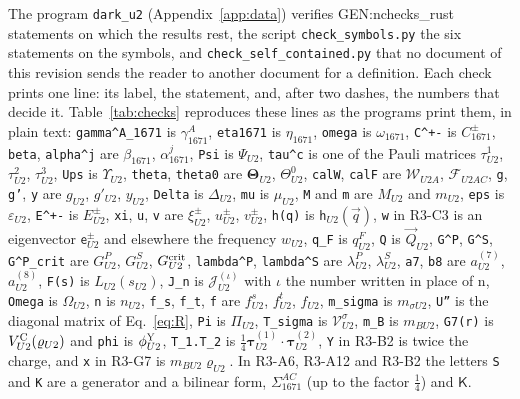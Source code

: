 The program \texttt{dark\_u2} (Appendix~\ref{app:data}) verifies {{GEN:nchecks_rust}} statements on
which the results rest, the script \texttt{check\_symbols.py} the six statements on the symbols, and
\texttt{check\_self\_contained.py} that no document of this revision sends the reader to another
document for a definition. Each check prints one line: its label, the statement, and, after two
dashes, the numbers that decide it. Table~\ref{tab:checks} reproduces these lines as the programs
print them, in plain text: \texttt{gamma\^{}A\_1671} is $\gamma^A_{1671}$, \texttt{eta1671} is
$\eta_{1671}$, \texttt{omega} is $\omega_{1671}$, \texttt{C\^{}+-} is $C^\pm_{1671}$, \texttt{beta},
\texttt{alpha\^{}j} are $\beta_{1671}$, $\alpha^j_{1671}$, \texttt{Psi} is $\Psi_{U2}$, \texttt{tau\^{}c}
is one of the Pauli matrices $\tau^1_{U2}$, $\tau^2_{U2}$, $\tau^3_{U2}$, \texttt{Ups} is
$\Upsilon_{U2}$, \texttt{theta}, \texttt{theta0} are $\boldsymbol\Theta_{U2}$, $\Theta^0_{U2}$,
\texttt{calW}, \texttt{calF} are $\mathcal W_{U2A}$, $\mathcal F_{U2AC}$, \texttt{g}, \texttt{g'},
\texttt{y} are $g_{U2}$, $g'_{U2}$, $y_{U2}$, \texttt{Delta} is $\Delta_{U2}$, \texttt{mu} is
$\mu_{U2}$, \texttt{M} and \texttt{m} are $M_{U2}$ and $m_{U2}$, \texttt{eps} is $\varepsilon_{U2}$,
\texttt{E\^{}+-} is $E^\pm_{U2}$, \texttt{xi}, \texttt{u}, \texttt{v} are $\xi^\pm_{U2}$, $u^\pm_{U2}$,
$v^\pm_{U2}$, \texttt{h(q)} is $\mathsf h_{U2}(\vec q)$, \texttt{w} in R3-C3 is an eigenvector
$\mathsf e^\pm_{U2}$ and elsewhere the frequency $w_{U2}$, \texttt{q\_F} is $q^F_{U2}$, \texttt{Q} is
$\vec Q_{U2}$, \texttt{G\^{}P}, \texttt{G\^{}S}, \texttt{G\^{}P\_crit} are $G^P_{U2}$, $G^S_{U2}$,
$G^{\rm crit}_{U2}$, \texttt{lambda\^{}P}, \texttt{lambda\^{}S} are $\lambda^P_{U2}$, $\lambda^S_{U2}$,
\texttt{a7}, \texttt{b8} are $a^{(7)}_{U2}$, $a^{(8)}_{U2}$, \texttt{F(s)} is $L_{U2}(s_{U2})$,
\texttt{J\_n} is $\mathcal J^{(\iota)}_{U2}$ with $\iota$ the number written in place of n,
\texttt{Omega} is $\Omega_{U2}$, \texttt{n} is $n_{U2}$, \texttt{f\_s}, \texttt{f\_t}, \texttt{f}
are $f^s_{U2}$, $f^t_{U2}$, $f_{U2}$, \texttt{m\_sigma} is $m_{\sigma U2}$, \texttt{U''} is the diagonal
matrix of Eq.~\eqref{eq:R}, \texttt{Pi} is $\Pi_{U2}$, \texttt{T\_sigma} is $\mathcal V^\sigma_{U2}$,
\texttt{m\_B} is $m_{BU2}$, \texttt{G7(r)} is $V^{\rm C}_{U2}(\varrho_{U2})$ and \texttt{phi} is
$\phi^{\rm Y}_{U2}$, \texttt{T\_1.T\_2} is $\tfrac14\boldsymbol\tau^{(1)}_{U2}\cdot\boldsymbol\tau^{(2)}_{U2}$,
\texttt{Y} in R3-B2 is twice the charge, and \texttt{x} in R3-G7 is $m_{BU2}\varrho_{U2}$. In
R3-A6, R3-A12 and R3-B2 the letters \texttt{S} and \texttt{K} are a generator and a bilinear form,
$\Sigma^{AC}_{1671}$ (up to the factor $\tfrac14$) and $\mathsf K$.

